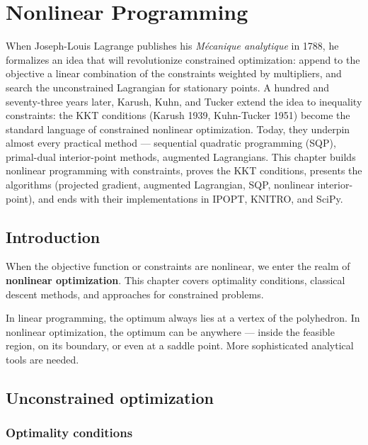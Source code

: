 \chapter{Nonlinear Programming}
\label{ch:nonlinear}

When Joseph-Louis Lagrange publishes his \emph{Mécanique analytique} in 1788, he formalizes an idea that will revolutionize constrained optimization: append to the objective a linear combination of the constraints weighted by multipliers, and search the unconstrained Lagrangian for stationary points. A hundred and seventy-three years later, Karush, Kuhn, and Tucker extend the idea to inequality constraints: the KKT conditions (Karush 1939, Kuhn-Tucker 1951) become the standard language of constrained nonlinear optimization. Today, they underpin almost every practical method --- sequential quadratic programming (SQP), primal-dual interior-point methods, augmented Lagrangians. This chapter builds nonlinear programming with constraints, proves the KKT conditions, presents the algorithms (projected gradient, augmented Lagrangian, SQP, nonlinear interior-point), and ends with their implementations in IPOPT, KNITRO, and SciPy.

\section{Introduction}

When the objective function or constraints are nonlinear, we enter the realm
of \textbf{nonlinear optimization}. This chapter covers optimality conditions,
classical descent methods, and approaches for constrained problems.

\begin{intuition}
In linear programming, the optimum always lies at a vertex of the polyhedron.
In nonlinear optimization, the optimum can be anywhere --- inside the feasible
region, on its boundary, or even at a saddle point. More sophisticated
analytical tools are needed.
\end{intuition}

\section{Unconstrained optimization}

\subsection{Optimality conditions}

